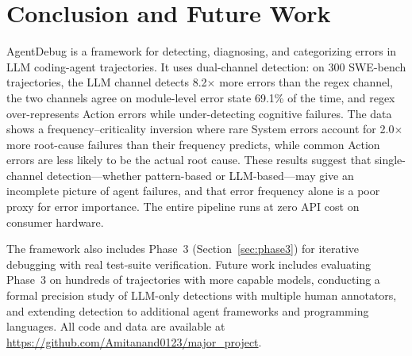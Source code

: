 \documentclass{ieeeaccess}
\begin{document}
\section{Conclusion and Future Work}
\label{sec:conclusion}

AgentDebug is a framework for detecting, diagnosing, and categorizing errors in LLM coding-agent trajectories. It uses dual-channel detection: on 300 SWE-bench trajectories, the LLM channel detects 8.2$\times$ more errors than the regex channel, the two channels agree on module-level error state 69.1\% of the time, and regex over-represents Action errors while under-detecting cognitive failures. The data shows a frequency--criticality inversion where rare System errors account for 2.0$\times$ more root-cause failures than their frequency predicts, while common Action errors are less likely to be the actual root cause. These results suggest that single-channel detection---whether pattern-based or LLM-based---may give an incomplete picture of agent failures, and that error frequency alone is a poor proxy for error importance. The entire pipeline runs at zero API cost on consumer hardware.

The framework also includes Phase~3 (Section~\ref{sec:phase3}) for iterative debugging with real test-suite verification. Future work includes evaluating Phase~3 on hundreds of trajectories with more capable models, conducting a formal precision study of LLM-only detections with multiple human annotators, and extending detection to additional agent frameworks and programming languages. All code and data are available at \url{https://github.com/Amitanand0123/major_project}.
\end{document}
